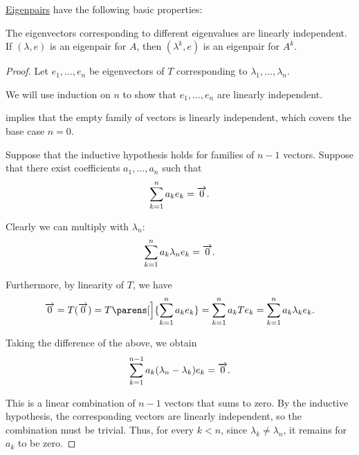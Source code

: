 \begin{proposition}\label{thm:def:eigenpair}
  \hyperref[def:eigenpair]{Eigenpairs} have the following basic properties:
  \begin{thmenum}
     The eigenvectors corresponding to different eigenvalues are linearly independent.
     If \( (\lambda, e) \) is an eigenpair for \( A \), then \( (\lambda^k, e) \) is an eigenpair for \( A^k \).
  \end{thmenum}
\end{proposition}
\begin{proof}
   Let \( e_1, \ldots, e_n \) be eigenvectors of \( T \) corresponding to \( \lambda_1, \ldots, \lambda_n \).

  We will use induction on \( n \) to show that \( e_1, \ldots, e_n \) are linearly independent.

   implies that the empty family of vectors is linearly independent, which covers the base case \( n = 0 \).

  Suppose that the inductive hypothesis holds for families of \( n - 1 \) vectors. Suppose that there exist coefficients \( a_1, \ldots, a_n \) such that
  \begin{equation*}
    \sum_{k=1}^n a_k e_k = \overrightarrow{0}.
  \end{equation*}

  Clearly we can multiply with \( \lambda_n \):
  \begin{equation*}
    \sum_{k=1}^n a_k \lambda_n e_k = \overrightarrow{0}.
  \end{equation*}

  Furthermore, by linearity of \( T \), we have
  \begin{equation*}
    \vect 0
    =
    T(\vect 0)
    =
    T\parens[\Big]{ \sum_{k=1}^n a_k e_k }
    =
    \sum_{k=1}^n a_k T e_k
    =
    \sum_{k=1}^n a_k \lambda_k e_k.
  \end{equation*}

  Taking the difference of the above, we obtain
  \begin{equation*}
    \sum_{k=1}^{n-1} a_k (\lambda_n - \lambda_k) e_k = \overrightarrow{0}.
  \end{equation*}

  This is a linear combination of \( n - 1 \) vectors that sums to zero. By the inductive hypothesis, the corresponding vectors are linearly independent, so the combination must be trivial. Thus, for every \( k < n \), since \( \lambda_k \neq \lambda_n \), it remains for \( a_k \) to be zero.


\end{proof}
